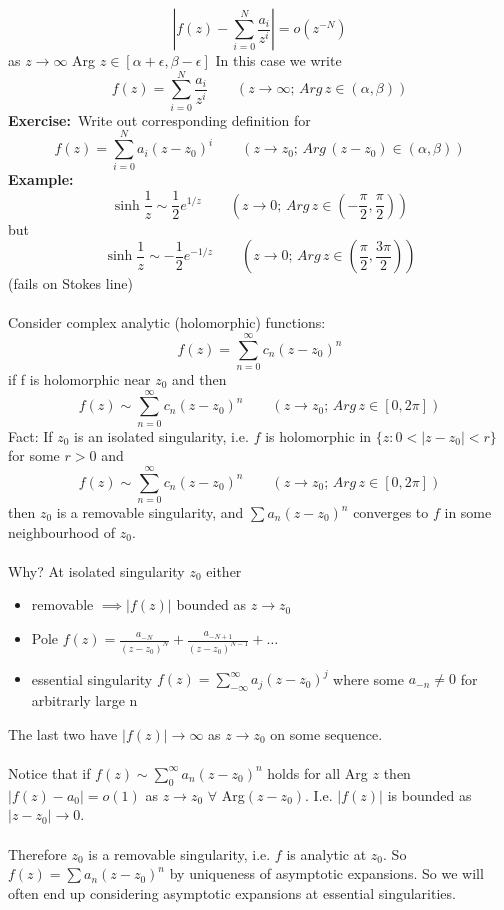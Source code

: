 \documentclass{article}
\newcommand{\example}{\textbf{Example:}}
\newcommand{\exercise}{\textbf{Exercise:}}
\begin{document}
\[\left| f(z) - \sum_{i=0}^{N} \frac{a_i}{z^i} \right| = o(z^{-N})\]
as $z \to \infty$ Arg $z \in [ \alpha + \epsilon , \beta - \epsilon ]$
In this case we write
\[ f(z) = \sum_{i=0}^{N} \frac{a_i}{z^i} \qquad (z \to \infty; \, Arg \, z \in
(\alpha,\beta) )\]
\exercise\ Write out corresponding definition for 
\[ f(z) = \sum_{i=0}^{N} a_i(z-z_0)^i \qquad (z \to z_0; \, Arg \,( z- z_0) \in
(\alpha,\beta) )\]
\example\ 
\[ \sinh \frac{1}{z} \sim \frac{1}{2} e^{1/z} \qquad (z \to 0; \, Arg \, z \in 
(-\frac{\pi}{2}, \frac{\pi}{2} ) ) \]
but 
\[ \sinh \frac{1}{z} \sim -\frac{1}{2} e^{-1/z} \qquad (z \to 0; \, Arg \, z \in 
(\frac{\pi}{2}, \frac{3\pi}{2} ) ) \]
(fails on Stokes line)
\\
\\
Consider complex analytic (holomorphic) functions:
\[ f(z) = \sum _{n=0}^{\infty} c_n (z - z_0)^n\]
if f is holomorphic near $z_0$ and then 
\[ f(z) \sim \sum _{n=0}^{\infty} c_n (z - z_0)^n \qquad (z \to z_0; \, Arg \, z 
\in [0, 2\pi])\]
Fact: If $z_0$ is an isolated singularity, i.e. $f$ is holomorphic in 
$\{ z : 0 < |z-z_0| < r \}$ for some $r>0$ and 
\[ f(z) \sim \sum _{n=0}^{\infty} c_n (z - z_0)^n \qquad (z \to z_0; \, Arg \, z 
\in [0, 2\pi])\]
then $z_0$ is a removable singularity, and $\sum a_n (z-z_0)^n$ converges to
$f$ in some neighbourhood of $z_0$.
\\
\\
Why? At isolated singularity $z_0$ either 
\begin{itemize}
\item removable $\implies |f(z)|$ bounded as $z\to z_0$ 
\item Pole $f(z) = \frac{a_{-N}}{(z-z_0)^N} + \frac{a_{-N+1}}{(z-z_0)^{N-1}} + \dots$
\item essential singularity $f(z) = \sum_{-\infty}^{\infty} a_j(z-z_0)^j$
      where some $a_{-n} \neq 0$ for arbitrarly large n
\end{itemize}
The last two have $|f(z)|\to \infty$ as $z \to z_0$ on some sequence.
\\
\\
Notice that if $f(z) \sim \sum_0^{\infty} a_n (z-z_0)^n$ holds for all Arg $z$ then
$|f(z) - a_0| = o(1)$ as $z \to z_0$ $\forall$ Arg$(z-z_0)$. I.e. $|f(z)|$
is bounded as $|z-z_0| \to 0$.
\\
\\
Therefore $z_0$ is a removable singularity, i.e. $f$ is analytic at $z_0$. So
$f(z) = \sum a_n (z-z_0)^n$ by uniqueness of asymptotic expansions. So we will
often end up considering asymptotic expansions at essential singularities. 
\\
\end{document}
